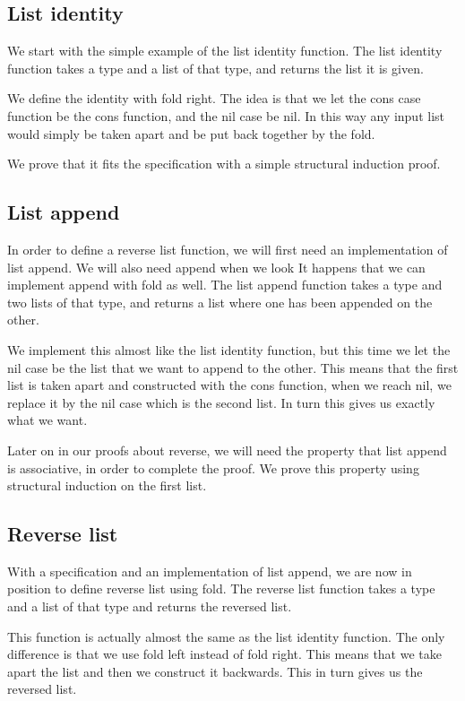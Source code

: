 \documentclass[a4paper]{article}
\begin{document}
\subsection{List identity}
We start with the simple example of the list identity function. The
list identity function takes a type and a list of that type, and
returns the list it is given.

We define the identity with fold right. The idea is that we let the
cons case function be the cons function, and the nil case be nil. In
this way any input list would simply be taken apart and be put back
together by the fold.

We prove that it fits the specification with a simple structural
induction proof.

\subsection{List append}
In order to define a reverse list function, we will first need an
implementation of list append. We will also need append when we look
It happens that we can implement append with fold as well. The list
append function takes a type and two lists of that type, and returns a
list where one has been appended on the other.

We implement this almost like the list identity function, but this time
we let the nil case be the list that we want to append to the other.
This means that the first list is taken apart and constructed with the
cons function, when we reach nil, we replace it by the nil case which
is the second list. In turn this gives us exactly what we want.

Later on in our proofs about reverse, we will need the property that list
append is associative, in order to complete the proof. We prove this
property using structural induction on the first list.

\subsection{Reverse list}
With a specification and an implementation of list append, we are now
in position to define reverse list using fold. The reverse list function
takes a type and a list of that type and returns the reversed list.

This function is actually almost the same as the list identity
function. The only difference is that we use fold left instead of fold
right. This means that we take apart the list and then we construct
it backwards. This in turn gives us the reversed list.
\end{document}
